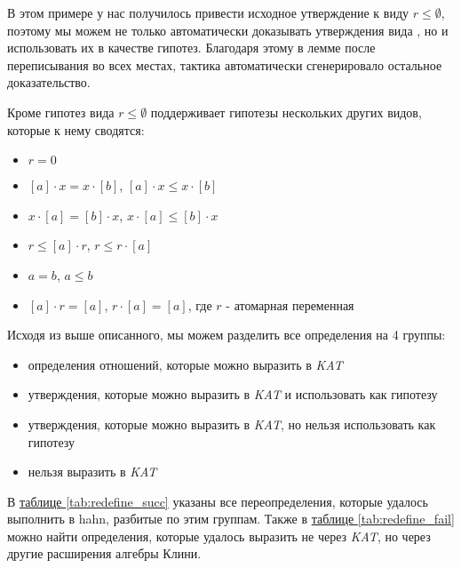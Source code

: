 \documentclass[times
              ]{itmo-student-thesis}
\begin{document}
      В этом примере у нас получилось привести исходное утверждение к виду $r \leq \emptyset$, поэтому мы можем не только
      автоматически доказывать утверждения вида , но и использовать их в качестве гипотез.
      Благодаря этому в лемме  после переписывания  во всех местах, тактика 
      автоматически сгенерировало остальное доказательство.

      Кроме гипотез вида $r \leq \emptyset$ \; поддерживает гипотезы нескольких других видов, которые к нему
      сводятся:
      \begin{itemize}
        \item $ r = 0 $
        \item $[a] \cdot x = x \cdot [b]$, $[a] \cdot x \leq x \cdot [b]$
        \item $x \cdot [a] = [b] \cdot x$, $x \cdot [a] \leq [b] \cdot x$
        \item $ r \leq [a] \cdot r $, $ r \leq r \cdot [a]$
        \item $ a = b $, $ a \leq b $
        \item $[a] \cdot r = [a]$, $r \cdot [a] = [a]$, где $r$ - атомарная переменная
      \end{itemize}

      Исходя из выше описанного, мы можем разделить все определения на 4 группы:
      \begin{itemize}
        \item определения отношений, которые можно выразить в \textit{KAT}
        \item утверждения, которые можно выразить в \textit{KAT} и использовать как гипотезу
        \item утверждения, которые можно выразить в \textit{KAT}, но нельзя использовать как гипотезу
        \item нельзя выразить в \textit{KAT}
      \end{itemize}

      В \hyperref[tab:redefine_succ]{таблице \ref{tab:redefine_succ}} указаны все переопределения,
      которые удалось выполнить в hahn, разбитые по этим группам.
      Также в \hyperref[tab:redefine_fail]{таблице \ref{tab:redefine_fail}} можно найти определения, которые
      удалось выразить не через \textit{KAT}, но через другие расширения алгебры Клини.
\end{document}
